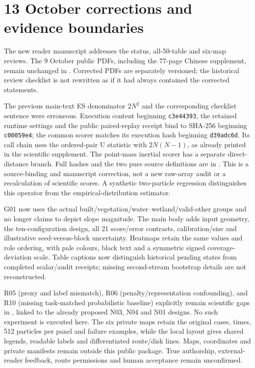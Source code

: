 \section{13 October corrections and evidence boundaries}\label{sec:reader-v2-errata}
The new reader manuscript addresses the status, all-50-table and six-map
reviews. The 9 October public PDFs, including the 77-page Chinese
supplement, remain unchanged in . Corrected PDFs
are separately versioned; the historical review checklist is not rewritten
as if it had always contained the corrected statements.

The previous main-text ES denominator $2N^2$ and the corresponding checklist
sentence were erroneous. Execution content beginning \texttt{c3e44393},
the retained runtime settings and the public paired-replay receipt bind
 to SHA-256 beginning \texttt{c00059e4}; the common scorer
 matches its execution hash beginning
\texttt{d39adc6d}. Its call chain uses the ordered-pair U statistic with
$2N(N-1)$, as already printed in the scientific supplement. The point-mass
inertial scorer has a separate direct-distance branch. Full hashes and the
two pure source definitions are in .
This is a source-binding and manuscript correction, not a new raw-array audit
or a recalculation of scientific scores. A synthetic two-particle regression
distinguishes this operator from the empirical-distribution estimator.

G01 now uses the actual built/vegetation/water--wetland/valid-other groups
and no longer claims to depict slope magnitude. The main body adds input
geometry, the ten-configuration design, all 21 score/error contrasts,
calibration/size and illustrative seed-versus-block uncertainty.
Heatmaps retain the same values and role ordering, with pale colours,
black text and a symmetric signed coverage-deviation scale. Table captions
now distinguish historical pending states from completed scalar/audit
receipts; missing second-stream bootstrap details are not reconstructed.

R05 (proxy and label mismatch), R06 (penalty/representation confounding),
and R10 (missing task-matched probabilistic baseline) explicitly remain
scientific gaps in , linked to the already
proposed N03, N04 and N01 designs. No such experiment is executed here.
The six private maps retain the original cases, times, 512 particles per
panel and failure examples, while the local layout gives shared legends,
readable labels and differentiated route/disk lines. Maps, coordinates
and private manifests remain outside this public package. True authorship,
external-reader feedback, route permissions and human acceptance remain
unconfirmed.
